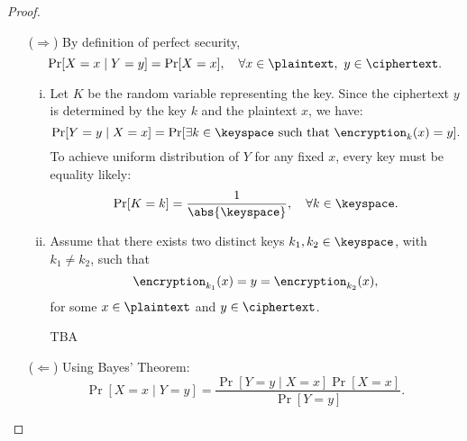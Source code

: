 \newpage
{}
\begin{proof}
\begin{enumerate}
	\item[($\Rightarrow$)] By definition of perfect security, \[
	\Pr[X=x\mid Y=y]=\Pr[X=x],\quad\forall x\in\plaintext,\ y\in\ciphertext.
	\] 
	\begin{enumerate}[(i)]
		\item Let $K$ be the random variable representing the key. Since the ciphertext 
		$y$ is determined by the key $k$ and the plaintext $x$, we have: \[
		\Pr[Y=y\mid X=x]=\Pr[\exists k\in\keyspace\ \text{such that}\ \encryption_k(x)=y].
		\] To achieve uniform distribution of $Y$ for any fixed $x$, every key must be equality likely: \[
		\Pr[K=k]=\frac{1}{\abs{\keyspace}},\quad\forall k\in\keyspace.
		\]
		\item Assume that there exists two distinct keys $k_1,k_2\in\keyspace$, with $k_1\neq k_2$, such that \[
		\encryption_{k_1}(x)=y=\encryption_{k_2}(x),
		\] for some $x\in\plaintext$ and $y\in\ciphertext$.
		
		TBA
	\end{enumerate}
	\item[($\Leftarrow$)] Using Bayes' Theorem: \[
	\Pr[X=x\mid Y=y]=\frac{\Pr[Y=y\mid X=x]\Pr[X=x]}{\Pr[Y=y]}.
	\]
\end{enumerate}
\end{proof}

